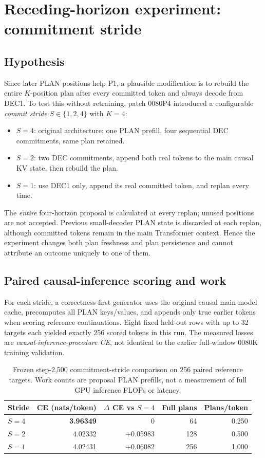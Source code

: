 \documentclass[11pt,letterpaper]{article}
\begin{document}
\section{Receding-horizon experiment: commitment stride}
\subsection{Hypothesis}
Since later PLAN positions help P1, a plausible modification is to rebuild the entire $K$-position plan after every committed token and always decode from DEC1. To test this without retraining, patch 0080P4 introduced a configurable \emph{commit stride} $S\in\{1,2,4\}$ with $K=4$:
\begin{itemize}
\item $S=4$: original architecture; one PLAN prefill, four sequential DEC commitments, same plan retained.
\item $S=2$: two DEC commitments, append both real tokens to the main causal KV state, then rebuild the plan.
\item $S=1$: use DEC1 only, append its real committed token, and replan every time.
\end{itemize}
The \emph{entire} four-horizon proposal is calculated at every replan; unused positions are not accepted. Previous small-decoder PLAN state is discarded at each replan, although committed tokens remain in the main Transformer context. Hence the experiment changes both plan freshness and plan persistence and cannot attribute an outcome uniquely to one of them.

\subsection{Paired causal-inference scoring and work}
For each stride, a correctness-first generator uses the original causal main-model cache, precomputes all PLAN keys/values, and appends only true earlier tokens when scoring reference continuations. Eight fixed held-out rows with up to 32 targets each yielded exactly 256 scored tokens in this run. The measured losses are \emph{causal-inference-procedure CE}, not identical to the earlier full-window 0080K training validation.

\begin{table}[ht]
\centering
\caption{Frozen step-2,500 commitment-stride comparison on 256 paired reference targets. Work counts are proposal PLAN prefills, not a measurement of full GPU inference FLOPs or latency.}
\label{tab:stride}
\begin{tabular}{@{}lrrrr@{}}\toprule
Stride & CE (nats/token) & $\Delta$ CE vs $S=4$ & Full plans & Plans/token\\\midrule
$S=4$ & \textbf{3.96349} & 0 & 64 & 0.250\\
$S=2$ & 4.02332 & +0.05983 & 128 & 0.500\\
$S=1$ & 4.02431 & +0.06082 & 256 & 1.000\\\bottomrule
\end{tabular}
\end{table}
\end{document}
